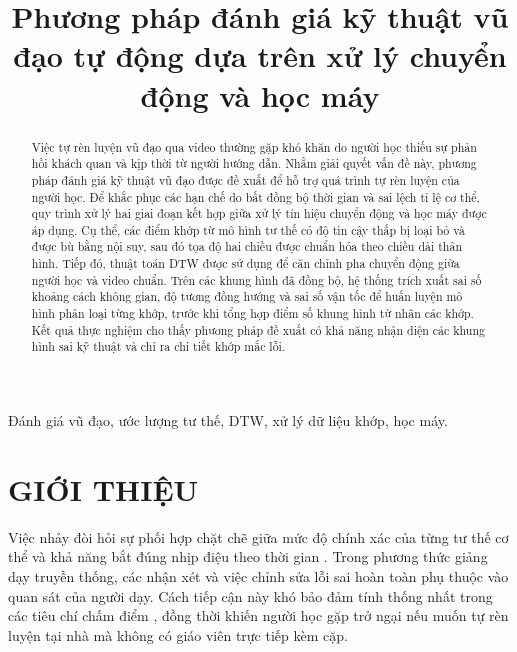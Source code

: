 \documentclass[10pt,conference,a4paper]{IEEEtran}
\begin{document}
\columnsep=0.63cm

\title{Phương pháp đánh giá kỹ thuật vũ đạo tự động dựa trên xử lý chuyển động và học máy}

\author{
}
\maketitle

\begin{abstract}
Việc tự rèn luyện vũ đạo qua video thường gặp khó khăn do người học thiếu sự phản hồi khách quan và kịp thời từ người hướng dẫn. Nhằm giải quyết vấn đề này, phương pháp đánh giá kỹ thuật vũ đạo được đề xuất để hỗ trợ quá trình tự rèn luyện của người học. Để khắc phục các hạn chế do bất đồng bộ thời gian và sai lệch tỉ lệ cơ thể, quy trình xử lý hai giai đoạn kết hợp giữa xử lý tín hiệu chuyển động và học máy được áp dụng. Cụ thể, các điểm khớp từ mô hình tư thế có độ tin cậy thấp bị loại bỏ và được bù bằng nội suy, sau đó tọa độ hai chiều được chuẩn hóa theo chiều dài thân hình. Tiếp đó, thuật toán DTW được sử dụng để căn chỉnh pha chuyển động giữa người học và video chuẩn. Trên các khung hình đã đồng bộ, hệ thống trích xuất sai số khoảng cách không gian, độ tương đồng hướng và sai số vận tốc để huấn luyện mô hình phân loại từng khớp, trước khi tổng hợp điểm số khung hình từ nhãn các khớp. Kết quả thực nghiệm cho thấy phương pháp đề xuất có khả năng nhận diện các khung hình sai kỹ thuật và chỉ ra chi tiết khớp mắc lỗi.
\end{abstract}

\begin{IEEEkeywords}
Đánh giá vũ đạo, ước lượng tư thế, DTW, xử lý dữ liệu khớp, học máy.
\end{IEEEkeywords}

\IEEEpeerreviewmaketitle

\section{GIỚI THIỆU}
\label{Sec:GioiThieu}

Việc nhảy đòi hỏi sự phối hợp chặt chẽ giữa mức độ chính xác của từng tư thế cơ thể và khả năng bắt đúng nhịp điệu theo thời gian \cite{Zhou_2021}. Trong phương thức giảng dạy truyền thống, các nhận xét và việc chỉnh sửa lỗi sai hoàn toàn phụ thuộc vào quan sát của người dạy. Cách tiếp cận này khó bảo đảm tính thống nhất trong các tiêu chí chấm điểm \cite{LAN2026200596}, đồng thời khiến người học gặp trở ngại nếu muốn tự rèn luyện tại nhà mà không có giáo viên trực tiếp kèm cặp.
\end{document}
